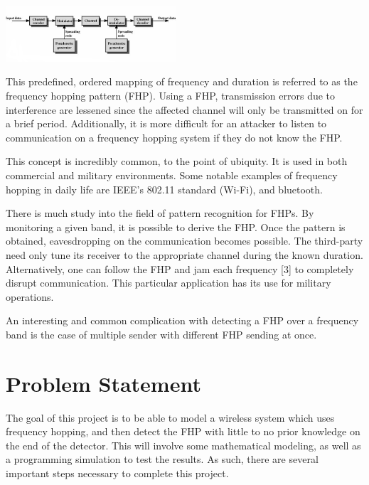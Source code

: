 \documentclass[conference]{IEEEtran}
\begin{document}
\begin{center}
\includegraphics[width=2.5in]{fhss.png}
\end{center}

This predefined, ordered mapping of frequency and duration is referred to as the frequency hopping pattern (FHP).
Using a FHP, transmission errors due to interference are lessened since the affected channel will only be transmitted on for a brief period.
Additionally, it is more difficult for an attacker to listen to communication on a frequency hopping system if they do not know the FHP.

This concept is incredibly common, to the point of ubiquity.
It is used in both commercial and military environments.
Some notable examples of frequency hopping in daily life are IEEE's 802.11 standard (Wi-Fi), and bluetooth.

There is much study into the field of pattern recognition for FHPs.
By monitoring a given band, it is possible to derive the FHP.
Once the pattern is obtained, eavesdropping on the communication becomes possible.
The third-party need only tune its receiver to the appropriate channel during the known duration.
Alternatively, one can follow the FHP and jam each frequency [3] to completely disrupt communication.
This particular application has its use for military operations.

An interesting and common complication with detecting a FHP over a frequency band is the case of multiple sender with different FHP sending at once.

\section{Problem Statement}

The goal of this project is to be able to model a wireless system which uses frequency hopping, and then detect the FHP with little to no prior knowledge on the end of the detector.
This will involve some mathematical modeling, as well as a programming simulation to test the results.
As such, there are several important steps necessary to complete this project.
\end{document}
